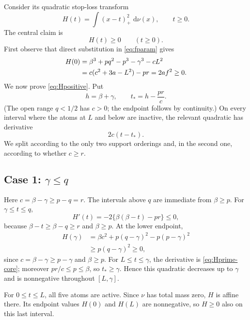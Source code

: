 \documentclass[11pt]{article}
\theoremstyle{remark}
\newcommand{\dd}{\,\mathrm d}
\begin{document}
Consider its quadratic stop-loss transform
\begin{equation}\label{eq:Hdef}
 H(t)=\int (x-t)_+^2\,\dd\nu(x),\qquad t\ge0.
\end{equation}
The central claim is
\begin{equation}\label{eq:Hpositive}
 H(t)\ge0\qquad(t\ge0).
\end{equation}
First observe that direct substitution in \eqref{eq:fparam} gives
\begin{align}
 H(0)
 &=\beta^3+pq^2-p^3-\gamma^3-cL^2 \notag\\
 &=c(c^2+3a-L^2)-pr
 =2af^2\ge0.                                      \label{eq:H0}
\end{align}
We now prove \eqref{eq:Hpositive}.  Put
\begin{equation}\label{eq:h-tstar}
 h=\beta+\gamma,
 \qquad
 t_*=h-\frac{pr}{c}.
\end{equation}
(The open range $q<1/2$ has $c>0$; the endpoint follows by continuity.)
On every interval where the atoms at $L$ and below are inactive, the relevant
quadratic has derivative
\begin{equation}\label{eq:Hprime-core}
 2c(t-t_*).
\end{equation}
We split according to the only two support orderings and, in the second one,
according to whether $c\ge r$.

\subsection*{Case 1: $\gamma\le q$}
Here $c=\beta-\gamma\ge p-q=r$.  The intervals above $q$ are immediate from
$\beta\ge p$.  For $\gamma\le t\le q$,
\[
 H'(t)=-2\{\beta(\beta-t)-pr\}\le0,
\]
because $\beta-t\ge\beta-q\ge r$ and $\beta\ge p$.
At the lower endpoint,
\begin{align*}
 H(\gamma)
 &=\beta c^2+p(q-\gamma)^2-p(p-\gamma)^2\\
 &\ge p(q-\gamma)^2\ge0,
\end{align*}
since $c=\beta-\gamma\ge p-\gamma$ and $\beta\ge p$.
For $L\le t\le\gamma$, the derivative is \eqref{eq:Hprime-core}; moreover
$pr/c\le p\le\beta$, so $t_*\ge\gamma$.  Hence this quadratic decreases up
to $\gamma$ and is nonnegative throughout $[L,\gamma]$.

For $0\le t\le L$, all five atoms are active.  Since $\nu$ has total mass
zero, $H$ is affine there.  Its endpoint values $H(0)$ and $H(L)$ are
nonnegative, so $H\ge0$ also on this last interval.
\end{document}
